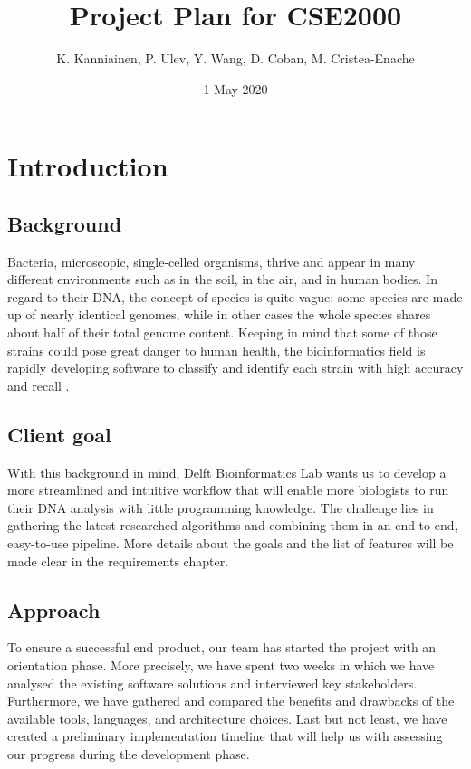 \documentclass{report}
\title{Project Plan for CSE2000}
\author{K. Kanniainen, P. Ulev, Y. Wang, D. Coban, M. Cristea-Enache}
\date{1 May 2020}
\begin{document}
\maketitle



\tableofcontents{}

\chapter{Introduction}
\section{Background}
Bacteria, microscopic, single-celled organisms, thrive and appear in many different environments such as in the soil, in the air, and in human bodies. In regard to their DNA, the concept of species is quite vague: some species are made up of nearly identical genomes, while in other cases the whole species shares about half of their total genome content. Keeping in mind that some of those strains could pose great danger to human health, the bioinformatics field is rapidly developing software to classify and identify each strain with high accuracy and recall \cite{mpgprimer}.


\section{Client goal}
With this background in mind, Delft Bioinformatics Lab wants us to develop a more streamlined and intuitive workflow that will enable more biologists to run their DNA analysis with little programming knowledge. The challenge lies in gathering the latest researched algorithms and combining them in an end-to-end, easy-to-use pipeline. More details about the goals and the list of features will be made clear in the requirements chapter.

\section {Approach}
To ensure a successful end product, our team has started the project with an orientation phase. More precisely, we have spent two weeks in which we have analysed the existing software solutions and interviewed key stakeholders. Furthermore, we have gathered and compared the benefits and drawbacks of the available tools, languages, and architecture choices. Last but not least, we have created a preliminary implementation timeline that will help us with assessing our progress during the development phase.
\end{document}
